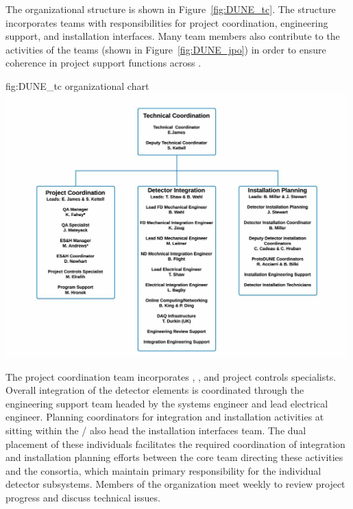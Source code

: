 The   organizational structure is shown 
in Figure~\ref{fig:DUNE_tc}.  The structure incorporates teams 
with responsibilities for project coordination, engineering 
support, and installation interfaces.  Many  team 
members also contribute to the activities of the  
teams (shown in Figure~\ref{fig:DUNE_jpo}) in order to ensure 
coherence in project support functions across .
\begin{dunefigure}{fig:DUNE_tc}
  {  organizational chart}
  \includegraphics[width=0.99\textwidth]{graphics/TC_OrgChart_v2}
\end{dunefigure}
The  project coordination team incorporates , 
, and project controls specialists.  Overall integration 
of the detector elements is coordinated through the  
engineering support team headed by the  systems 
engineer and lead  electrical engineer.  Planning 
coordinators for integration and installation activities at 
 sitting within the /  also head the  installation interfaces team.  
The dual placement of these individuals facilitates the required 
coordination of integration and installation planning efforts between 
the core team directing these activities and the  
consortia, which maintain primary responsibility for the individual 
detector subsystems.  Members of the  organization meet 
weekly to review project progress and discuss technical issues. 
     
